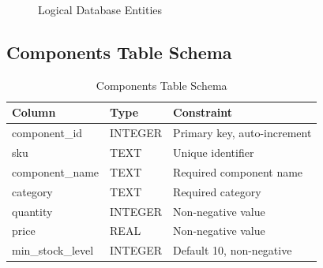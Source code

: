 \documentclass[conference]{IEEEtran}
\begin{document}
\begin{figure}[!t]
\centering
{}
\caption{Logical Database Entities}
\label{fig:erd}
\end{figure}

\subsection{Components Table Schema}

\begin{table}[!t]
\caption{Components Table Schema}
\label{tab:components}
\centering
\small
\begin{tabularx}{\columnwidth}{l l Y}
\toprule
\textbf{Column} & \textbf{Type} & \textbf{Constraint}\\
\midrule
component\_id & INTEGER & Primary key, auto-increment\\
sku & TEXT & Unique identifier\\
component\_name & TEXT & Required component name\\
category & TEXT & Required category\\
quantity & INTEGER & Non-negative value\\
price & REAL & Non-negative value\\
min\_stock\_level & INTEGER & Default 10, non-negative\\
\bottomrule
\end{tabularx}
\end{table}
\end{document}
